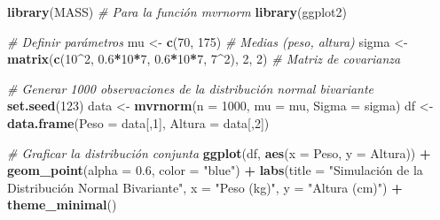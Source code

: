 \documentclass[
]{article}
\newenvironment{Shaded}{\begin{snugshade}}{\end{snugshade}}
\newcommand{\AttributeTok}[1]{\textcolor[rgb]{0.13,0.29,0.53}{#1}}
\newcommand{\CommentTok}[1]{\textcolor[rgb]{0.56,0.35,0.01}{\textit{#1}}}
\newcommand{\DecValTok}[1]{\textcolor[rgb]{0.00,0.00,0.81}{#1}}
\newcommand{\FloatTok}[1]{\textcolor[rgb]{0.00,0.00,0.81}{#1}}
\newcommand{\FunctionTok}[1]{\textcolor[rgb]{0.13,0.29,0.53}{\textbf{#1}}}
\newcommand{\NormalTok}[1]{#1}
\newcommand{\OtherTok}[1]{\textcolor[rgb]{0.56,0.35,0.01}{#1}}
\newcommand{\SpecialCharTok}[1]{\textcolor[rgb]{0.81,0.36,0.00}{\textbf{#1}}}
\newcommand{\StringTok}[1]{\textcolor[rgb]{0.31,0.60,0.02}{#1}}
\begin{document}
\begin{Shaded}
\begin{Highlighting}[]
\FunctionTok{library}\NormalTok{(MASS)  }\CommentTok{\# Para la función mvrnorm}
\FunctionTok{library}\NormalTok{(ggplot2)}

\CommentTok{\# Definir parámetros}
\NormalTok{mu }\OtherTok{\textless{}{-}} \FunctionTok{c}\NormalTok{(}\DecValTok{70}\NormalTok{, }\DecValTok{175}\NormalTok{)  }\CommentTok{\# Medias (peso, altura)}
\NormalTok{sigma }\OtherTok{\textless{}{-}} \FunctionTok{matrix}\NormalTok{(}\FunctionTok{c}\NormalTok{(}\DecValTok{10}\SpecialCharTok{\^{}}\DecValTok{2}\NormalTok{, }\FloatTok{0.6}\SpecialCharTok{*}\DecValTok{10}\SpecialCharTok{*}\DecValTok{7}\NormalTok{, }\FloatTok{0.6}\SpecialCharTok{*}\DecValTok{10}\SpecialCharTok{*}\DecValTok{7}\NormalTok{, }\DecValTok{7}\SpecialCharTok{\^{}}\DecValTok{2}\NormalTok{), }\DecValTok{2}\NormalTok{, }\DecValTok{2}\NormalTok{)  }\CommentTok{\# Matriz de covarianza}

\CommentTok{\# Generar 1000 observaciones de la distribución normal bivariante}
\FunctionTok{set.seed}\NormalTok{(}\DecValTok{123}\NormalTok{)}
\NormalTok{data }\OtherTok{\textless{}{-}} \FunctionTok{mvrnorm}\NormalTok{(}\AttributeTok{n =} \DecValTok{1000}\NormalTok{, }\AttributeTok{mu =}\NormalTok{ mu, }\AttributeTok{Sigma =}\NormalTok{ sigma)}
\NormalTok{df }\OtherTok{\textless{}{-}} \FunctionTok{data.frame}\NormalTok{(}\AttributeTok{Peso =}\NormalTok{ data[,}\DecValTok{1}\NormalTok{], }\AttributeTok{Altura =}\NormalTok{ data[,}\DecValTok{2}\NormalTok{])}

\CommentTok{\# Graficar la distribución conjunta}
\FunctionTok{ggplot}\NormalTok{(df, }\FunctionTok{aes}\NormalTok{(}\AttributeTok{x =}\NormalTok{ Peso, }\AttributeTok{y =}\NormalTok{ Altura)) }\SpecialCharTok{+}
  \FunctionTok{geom\_point}\NormalTok{(}\AttributeTok{alpha =} \FloatTok{0.6}\NormalTok{, }\AttributeTok{color =} \StringTok{"blue"}\NormalTok{) }\SpecialCharTok{+}
  \FunctionTok{labs}\NormalTok{(}\AttributeTok{title =} \StringTok{"Simulación de la Distribución Normal Bivariante"}\NormalTok{,}
       \AttributeTok{x =} \StringTok{"Peso (kg)"}\NormalTok{, }\AttributeTok{y =} \StringTok{"Altura (cm)"}\NormalTok{) }\SpecialCharTok{+}
  \FunctionTok{theme\_minimal}\NormalTok{()}
\end{Highlighting}
\end{Shaded}
\end{document}
